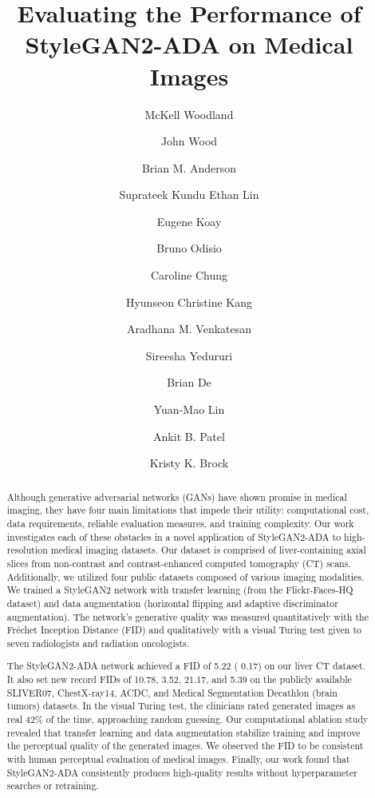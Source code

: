 \documentclass[runningheads]{llncs}
\begin{document}
\title{Evaluating the Performance of StyleGAN2-ADA on Medical Images}



\author{
McKell Woodland\and John Wood \and
Brian M. Anderson \and Suprateek Kundu
Ethan Lin \and
Eugene Koay \and
Bruno Odisio \and
Caroline Chung \and
Hyunseon Christine Kang \and Aradhana M. Venkatesan \and
Sireesha Yedururi \and
Brian De \and Yuan-Mao Lin \and Ankit B. Patel \and
Kristy K. Brock }



\maketitle              

\begin{abstract}
Although generative adversarial networks (GANs) have shown promise in medical imaging, they have four main limitations that impede their utility: computational cost, data requirements, reliable evaluation measures, and training complexity.
Our work investigates each of these obstacles in a novel application of StyleGAN2-ADA to high-resolution medical imaging datasets.
Our dataset is comprised of liver-containing axial slices from non-contrast and contrast-enhanced computed tomography (CT) scans.
Additionally, we utilized four public datasets composed of various imaging modalities.
We trained a StyleGAN2 network with transfer learning (from the Flickr-Faces-HQ dataset) and data augmentation (horizontal flipping and adaptive discriminator augmentation).
The network’s generative quality was measured quantitatively with the Fr\'{e}chet Inception Distance (FID) and qualitatively with a visual Turing test given to seven radiologists and radiation oncologists. 

The StyleGAN2-ADA network achieved a FID of 5.22 ( 0.17) on our liver CT dataset.
It also set new record FIDs of 10.78, 3.52, 21.17, and 5.39 on the publicly available SLIVER07, ChestX-ray14, ACDC, and Medical Segmentation Decathlon (brain tumors) datasets.
In the visual Turing test, the clinicians rated generated images as real 42\% of the time, approaching random guessing. 
Our computational ablation study revealed that transfer learning and data augmentation stabilize training and improve the perceptual quality of the generated images.
We observed the FID to be consistent with human perceptual evaluation of medical images.
Finally, our work found that StyleGAN2-ADA consistently produces high-quality results without hyperparameter searches or retraining.


\end{abstract}
\end{document}
